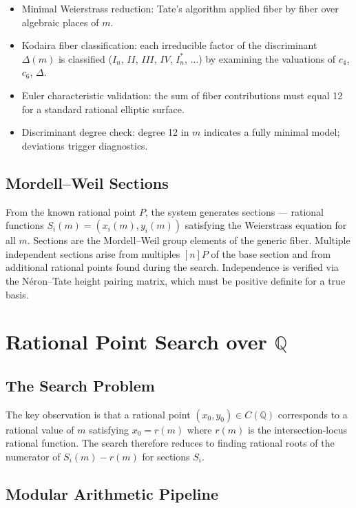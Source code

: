 \documentclass[11pt, a4paper]{article}
\begin{document}
\begin{itemize}[label={\textbullet}]
    \item Minimal Weierstrass reduction: Tate's algorithm applied fiber by fiber over algebraic places of $m$.
    \item Kodaira fiber classification: each irreducible factor of the discriminant $\Delta(m)$ is classified ($I_n$, $II$, $III$, $IV$, $I^*_n$, $\dots$) by examining the valuations of $c_4$, $c_6$, $\Delta$.
    \item Euler characteristic validation: the sum of fiber contributions must equal 12 for a standard rational elliptic surface.
    \item Discriminant degree check: degree 12 in $m$ indicates a fully minimal model; deviations trigger diagnostics.
\end{itemize}

\subsection{Mordell--Weil Sections}

From the known rational point $P$, the system generates sections --- rational functions $S_i(m) = (x_i(m), y_i(m))$ satisfying the Weierstrass equation for all $m$. Sections are the Mordell--Weil group elements of the generic fiber. Multiple independent sections arise from multiples $[n]P$ of the base section and from additional rational points found during the search. Independence is verified via the N\'eron--Tate height pairing matrix, which must be positive definite for a true basis.

\section{Rational Point Search over $\mathbb{Q}$}

\subsection{The Search Problem}

The key observation is that a rational point $(x_0, y_0) \in C(\mathbb{Q})$ corresponds to a rational value of $m$ satisfying $x_0 = r(m)$ where $r(m)$ is the intersection-locus rational function. The search therefore reduces to finding rational roots of the numerator of $S_i(m) - r(m)$ for sections $S_i$.

\subsection{Modular Arithmetic Pipeline}
\end{document}
